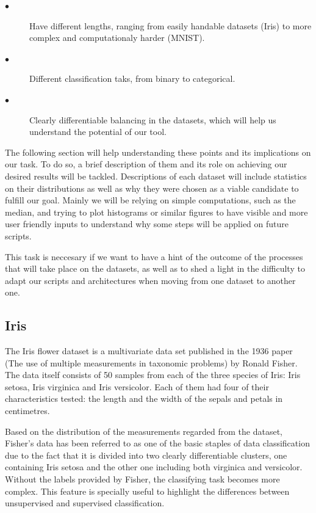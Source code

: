 \documentclass[12pt]{report}
\begin{document}
\begin{description}
	
\item[$\bullet$] Have different lengths, ranging from easily handable datasets (Iris) to more complex and computationaly harder (MNIST).

\item[$\bullet$] Different classification taks, from binary to categorical.

\item[$\bullet$] Clearly differentiable balancing in the datasets, which will help us understand the potential of our tool.

\end{description}

The following section will help understanding these points and its implications on our task. To do so, a brief description of them and its role on achieving our desired results will be tackled. Descriptions of each dataset will include statistics on their distributions as well as why they were chosen as a viable candidate to fulfill our goal. Mainly we will be relying on simple computations, such as the median, and trying to plot histograms or similar figures to have visible and more user friendly inputs to understand why some steps will be applied on future scripts.\par
 
This task is neccesary if we want to have a hint of the outcome of the processes that will take place on the datasets, as well as to shed a light in the difficulty to adapt our scripts and architectures when moving from one dataset to another one.

 

\subsection{Iris}

The Iris flower dataset is a multivariate data set published in the 1936 paper (The use of multiple measurements in taxonomic problems) by Ronald Fisher. The data itself consists of 50 samples from each of the three species of Iris: Iris setosa, Iris virginica and Iris versicolor. Each of them had four of their characteristics tested: the length and the width of the sepals and petals in centimetres. \par

Based on the distribution of the measurements regarded from the dataset, Fisher's data has been referred to as one of the basic staples of data classification due to the fact that it is divided into two clearly differentiable clusters, one containing Iris setosa and the other one including both virginica and versicolor. Without the labels provided by Fisher, the classifying task becomes more complex. This feature is specially useful to highlight the differences between unsupervised and supervised classification.\newline
\end{document}
